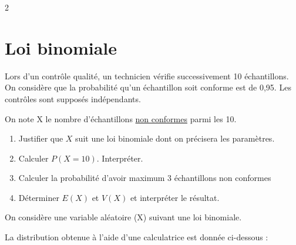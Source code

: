 \documentclass[10pt,a4paper]{article}
\begin{document}
\begin{multicols}{2}


\section{Loi binomiale}
\begin{exo}[][]
Lors d'un contrôle qualité, un technicien vérifie successivement 10 échantillons. On considère que la probabilité qu'un échantillon soit conforme est de 0,95. Les contrôles sont supposés indépendants.

On note X le nombre d'échantillons \underline{non conformes} parmi les 10.

\begin{enumerate}
    \item Justifier que \(X\) suit une loi binomiale dont on précisera les paramètres.
    \item Calculer \(P(X=10)\). Interpréter.
    \item Calculer la probabilité d'avoir maximum 3 échantillons non conformes
    \item Déterminer \(E(X)\) et \(V(X)\) et interpréter le résultat.
\end{enumerate}
\end{exo}


\begin{exo}[][appro]
    
On considère une variable aléatoire (X) suivant une loi binomiale.

La distribution obtenue à l'aide d'une calculatrice est donnée ci-dessous :

\begin{center}
\end{center}


\end{exo}
\end{multicols}
\end{document}
